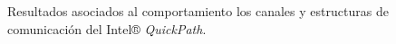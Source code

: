 \begin{figure}[ph!]
{	\label{fig:pcounterQPIc}
}
\caption{Resultados asociados al comportamiento los canales y estructuras de comunicación del Intel® \emph{QuickPath}.}
\label{fig:pcounterQPI}
\end{figure}


